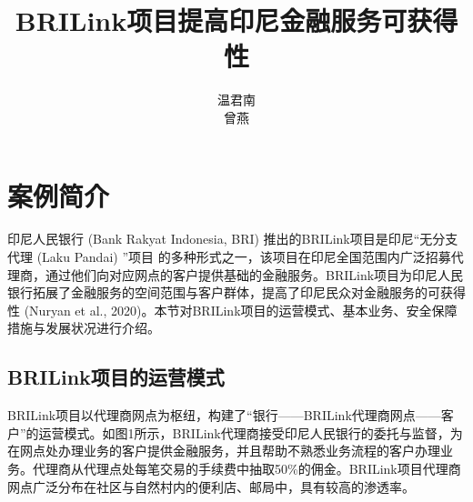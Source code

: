 \documentclass[UTF8]{ctexart}
\title{BRILink项目提高印尼金融服务可获得性}
\author{温君南 \\ 曾燕}
\begin{document}
    \maketitle

    \section{案例简介}
    印尼人民银行 (Bank Rakyat Indonesia, BRI) 推出的BRILink项目是印尼“无分支代理 (Laku Pandai) ”项目 的多种形式之一，该项目在印尼全国范围内广泛招募代理商，通过他们向对应网点的客户提供基础的金融服务。BRILink项目为印尼人民银行拓展了金融服务的空间范围与客户群体，提高了印尼民众对金融服务的可获得性 (Nuryan et al., 2020)。本节对BRILink项目的运营模式、基本业务、安全保障措施与发展状况进行介绍。

    \subsection{BRILink项目的运营模式}
    BRILink项目以代理商网点为枢纽，构建了“银行——BRILink代理商网点——客户”的运营模式。如图1所示，BRILink代理商接受印尼人民银行的委托与监督，为在网点处办理业务的客户提供金融服务，并且帮助不熟悉业务流程的客户办理业务。代理商从代理点处每笔交易的手续费中抽取50\%的佣金。BRILink项目代理商网点广泛分布在社区与自然村内的便利店、邮局中，具有较高的渗透率。
\end{document}
